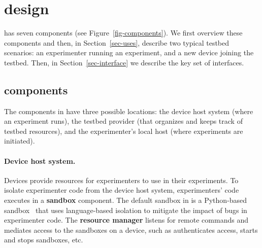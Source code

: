 \section{\sysname design}\label{sec-design}

 \sysname has
seven components (see Figure~\ref{fig-components}). We first overview
these components and then, in Section~\ref{sec-uses}, describe two
typical testbed scenarios: an experimenter running an experiment, and
a new device joining the testbed. Then, in Section~\ref{sec-interface}
we describe the key set of interfaces.

\subsection{\sysname components}
The components in \sysname have three possible locations: the device
host system (where an experiment runs), the testbed provider (that
organizes and keeps track of testbed resources), and the
experimenter's local host (where experiments are initiated).



\paragraph{\fontsize{11.6}{14}\selectfont Device host system.}
Devices provide resources for experimenters to use in their
experiments.
%
To isolate experimenter code from the device host system,
experimenters' code executes in a \textbf{sandbox} component. The default
sandbox in \sysname is a Python-based sandbox~\cite{RepySandbox} that uses language-based
isolation to mitigate the impact of bugs in experimenter
code. The \textbf{resource manager} listens for remote commands 
and mediates access to the sandboxes on a
device, such as authenticates access, starts and stops sandboxes, etc.
%
%


